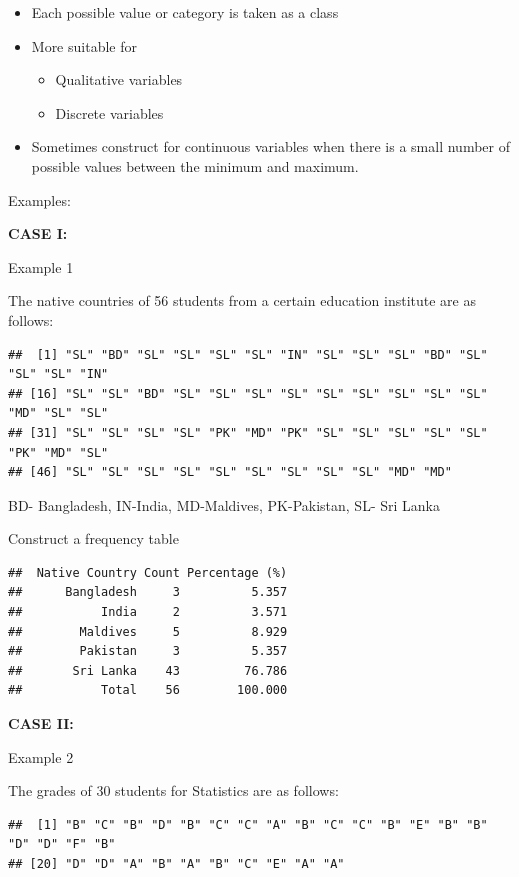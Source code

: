 \documentclass[]{book}
\providecommand{\tightlist}{%
  \setlength{\itemsep}{0pt}\setlength{\parskip}{0pt}}
\begin{document}
\begin{itemize}
\tightlist
\item
  Each possible value or category is taken as a class
\item
  More suitable for

  \begin{itemize}
  \tightlist
  \item
    Qualitative variables
  \item
    Discrete variables
  \end{itemize}
\item
  Sometimes construct for continuous variables when there is a small number of possible values between the minimum and maximum.
\end{itemize}

Examples:

\textbf{CASE I:}

Example 1

The native countries of 56 students from a certain education institute are as follows:

\begin{verbatim}
##  [1] "SL" "BD" "SL" "SL" "SL" "SL" "IN" "SL" "SL" "SL" "BD" "SL" "SL" "SL" "IN"
## [16] "SL" "SL" "BD" "SL" "SL" "SL" "SL" "SL" "SL" "SL" "SL" "SL" "MD" "SL" "SL"
## [31] "SL" "SL" "SL" "SL" "PK" "MD" "PK" "SL" "SL" "SL" "SL" "SL" "PK" "MD" "SL"
## [46] "SL" "SL" "SL" "SL" "SL" "SL" "SL" "SL" "SL" "MD" "MD"
\end{verbatim}

BD- Bangladesh, IN-India, MD-Maldives, PK-Pakistan, SL- Sri Lanka

Construct a frequency table

\begin{verbatim}
##  Native Country Count Percentage (%)
##      Bangladesh     3          5.357
##           India     2          3.571
##        Maldives     5          8.929
##        Pakistan     3          5.357
##       Sri Lanka    43         76.786
##           Total    56        100.000
\end{verbatim}

\textbf{CASE II:}

Example 2

The grades of 30 students for Statistics are as follows:

\begin{verbatim}
##  [1] "B" "C" "B" "D" "B" "C" "C" "A" "B" "C" "C" "B" "E" "B" "B" "D" "D" "F" "B"
## [20] "D" "D" "A" "B" "A" "B" "C" "E" "A" "A"
\end{verbatim}
\end{document}
